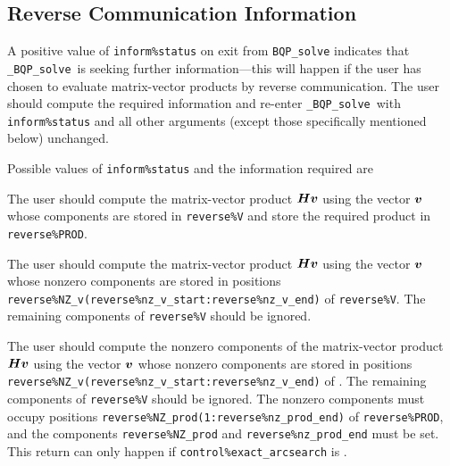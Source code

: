 \documentclass{galahad}
\newcommand{\packagename}{BQP}
\newcommand{\fullpackagename}{\libraryname\_\packagename}
\newcommand{\solver}{{\tt \fullpackagename\_solve}}
\begin{document}

\subsection{\label{reverse}Reverse Communication Information}

A positive value of {\tt inform\%status} on exit from 
{\tt \packagename\_solve}
indicates that
\solver\ is seeking further information---this will happen 
if the user has chosen to evaluate matrix-vector products by
reverse communication.
The user should compute the required information and re-enter \solver\
with {\tt inform\%status} and all other arguments (except those specifically
mentioned below) unchanged.

Possible values of {\tt inform\%status} and the information required are
\begin{description}
 The user should compute the matrix-vector product ${\bm{H}} {\bm{v}}$ 
     using the vector ${\bm{v}}$ whose components are stored in {\tt reverse\%V}
     and store the required product in {\tt reverse\%PROD}.

 The user should compute the matrix-vector product ${\bm{H}} {\bm{v}}$ 
     using the vector ${\bm{v}}$ whose nonzero components are stored in 
     positions  
     {\tt reverse\%NZ\_v(reverse\%nz\_v\_start:reverse\%nz\_v\_end)} 
     of {\tt reverse\%V}. The remaining components of {\tt reverse\%V}
     should be ignored.

 The user should compute the nonzero components of the 
     matrix-vector product ${\bm{H}} {\bm{v}}$ 
     using the vector ${\bm{v}}$ whose nonzero components are stored in 
     positions  
     {\tt reverse\%NZ\_v(reverse\%nz\_v\_start:reverse\%nz\_v\_end)} 
     of \linebreak {\tt reverse\%V}. The remaining components of 
     {\tt reverse\%V}
     should be ignored. The nonzero components must occupy positions
     {\tt reverse\%NZ\_prod(1:reverse\%nz\_prod\_end)} of {\tt reverse\%PROD},
     and the components \linebreak
     {\tt reverse\%NZ\_prod} and {\tt reverse\%nz\_prod\_end} must be set.
     This return can only happen if {\tt control\%exact\_arcsearch} is \true.

\end{description}



\end{document}
